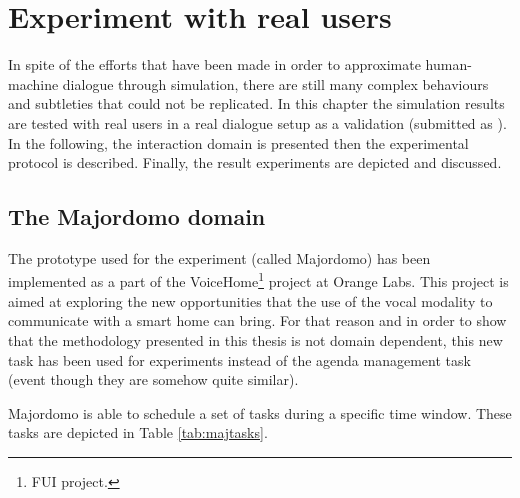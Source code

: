 \chapter{Experiment with real users}

\label{ch:experiment}

	In spite of the efforts that have been made in order to approximate human-machine dialogue through simulation, there are still many complex behaviours and subtleties that could not be replicated. In this chapter the simulation results are tested with real users in a real dialogue setup as a validation (submitted as \cite{Khouzaimi2016b}). In the following, the interaction domain is presented then the experimental protocol is described. Finally, the result experiments are depicted and discussed.

\section{The Majordomo domain}

	The prototype used for the experiment (called Majordomo) has been implemented as a part of the VoiceHome\footnote{FUI project.} project at Orange Labs. This project is aimed at exploring the new opportunities that the use of the vocal modality to communicate with a smart home can bring. For that reason and in order to show that the methodology presented in this thesis is not domain dependent, this new task has been used for experiments instead of the agenda management task (event though they are somehow quite similar).
	
	Majordomo is able to schedule a set of tasks during a specific time window. These tasks are depicted in Table \ref{tab:majtasks}.

